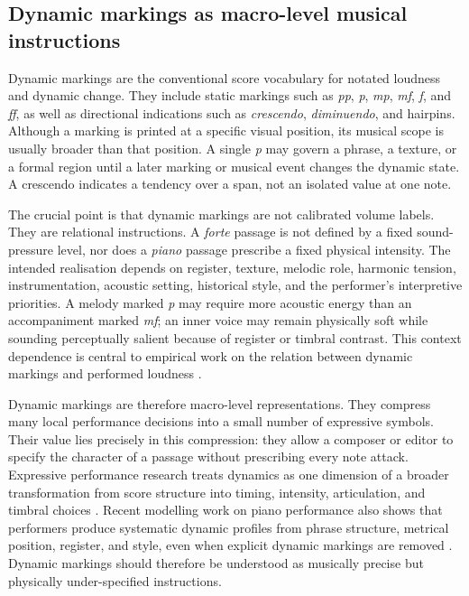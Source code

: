 \subsection{Dynamic markings as macro-level musical instructions}
\label{sec:bg:dynamic_markings}

Dynamic markings are the conventional score vocabulary for notated loudness and dynamic change. They include static markings such as \textit{pp}, \textit{p}, \textit{mp}, \textit{mf}, \textit{f}, and \textit{ff}, as well as directional indications such as \textit{crescendo}, \textit{diminuendo}, and hairpins. Although a marking is printed at a specific visual position, its musical scope is usually broader than that position. A single \textit{p} may govern a phrase, a texture, or a formal region until a later marking or musical event changes the dynamic state. A crescendo indicates a tendency over a span, not an isolated value at one note.

The crucial point is that dynamic markings are not calibrated volume labels. They are relational instructions. A \textit{forte} passage is not defined by a fixed sound-pressure level, nor does a \textit{piano} passage prescribe a fixed physical intensity. The intended realisation depends on register, texture, melodic role, harmonic tension, instrumentation, acoustic setting, historical style, and the performer's interpretive priorities. A melody marked \textit{p} may require more acoustic energy than an accompaniment marked \textit{mf}; an inner voice may remain physically soft while sounding perceptually salient because of register or timbral contrast. This context dependence is central to empirical work on the relation between dynamic markings and performed loudness \cite{kosta2014dynpiano,kosta2016mapping}.

Dynamic markings are therefore macro-level representations. They compress many local performance decisions into a small number of expressive symbols. Their value lies precisely in this compression: they allow a composer or editor to specify the character of a passage without prescribing every note attack. Expressive performance research treats dynamics as one dimension of a broader transformation from score structure into timing, intensity, articulation, and timbral choices \cite{cancinoChacon2018computational,grachten2012linear}. Recent modelling work on piano performance also shows that performers produce systematic dynamic profiles from phrase structure, metrical position, register, and style, even when explicit dynamic markings are removed \cite{jones2023probingdyn}. Dynamic markings should therefore be understood as musically precise but physically under-specified instructions.

